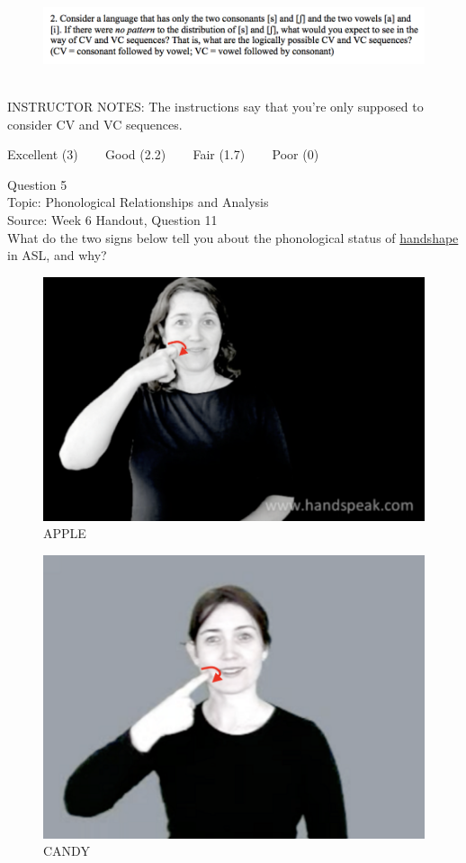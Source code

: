 \documentclass[12pt]{article}
\begin{document}
\begin{figure}[H]
\includegraphics{../images/skew2.png}
\end{figure}

~\\
INSTRUCTOR NOTES: The instructions say that you're only supposed to consider CV and VC sequences. 


\vfill
Excellent (3) ~~~ Good (2.2) ~~~ Fair (1.7) ~~~ Poor (0)
\newpage

{\large Question 5}\\

Topic: Phonological Relationships and Analysis\\
Source: Week 6 Handout, Question 11\\

What do the two signs below tell you about the phonological status of \underline{handshape} in ASL, and why?\\

\begin{figure}[H]
\includegraphics{../images/asl_apple.png}
\caption{APPLE}
\end{figure}
\begin{figure}[H]
\includegraphics{../images/asl_candy.png}
\caption{CANDY}
\end{figure}
\end{document}
